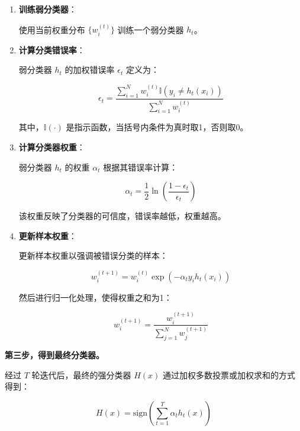 \documentclass[a4paper,11pt,AutoFakeBold]{ctexart}
\begin{document}
\begin{enumerate}
    \item \textbf{训练弱分类器}：
    
    使用当前权重分布 \( \{w_i^{(t)}\} \) 训练一个弱分类器 \( h_t \)。
    
    \item \textbf{计算分类错误率}：
    
    弱分类器 \( h_t \) 的加权错误率 \( \epsilon_t \) 定义为：
    
    \begin{equation}
    \epsilon_t = \frac{\sum_{i=1}^N w_i^{(t)} \mathbb{I}(y_i \neq h_t(x_i))}{\sum_{i=1}^N w_i^{(t)}}
    \end{equation}
    
    其中，\( \mathbb{I}(\cdot) \) 是指示函数，当括号内条件为真时取1，否则取0。
    
    \item \textbf{计算分类器权重}：
    
    弱分类器 \( h_t \) 的权重 \( \alpha_t \) 根据其错误率计算：
    
    \begin{equation}
    \alpha_t = \frac{1}{2} \ln \left( \frac{1 - \epsilon_t}{\epsilon_t} \right)
    \end{equation}
    
    该权重反映了分类器的可信度，错误率越低，权重越高。
    
    \item \textbf{更新样本权重}：
    
    更新样本权重以强调被错误分类的样本：
    
    \begin{equation}
    w_i^{(t+1)} = w_i^{(t)} \exp \left( -\alpha_t y_i h_t(x_i) \right)
    \end{equation}
    
    然后进行归一化处理，使得权重之和为1：
    
    \begin{equation}
    w_i^{(t+1)} = \frac{w_i^{(t+1)}}{\sum_{j=1}^N w_j^{(t+1)}}
    \end{equation}
\end{enumerate}

\textbf{第三步，得到最终分类器。}

经过 \( T \) 轮迭代后，最终的强分类器 \( H(x) \) 通过加权多数投票或加权求和的方式得到：

\begin{equation}
H(x) = \text{sign} \left( \sum_{t=1}^T \alpha_t h_t(x) \right)
\end{equation}
\end{document}

